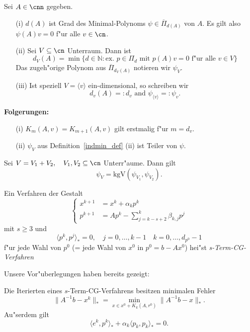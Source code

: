 \begin{defn} \label{indmin_def}
 Sei $A\in \cnn$ gegeben.
\begin{itemize}
\item[(i)] $d(A)$ ist Grad des Minimal-Polynoms $\psi \in \overline{\Pi}_{d(A)}$
      von $A$. Es gilt also $\psi(A)v = 0 $ f"ur alle $v \in \cn$.
\item[(ii)] Sei $V \subseteq \cn$ Unterraum. Dann ist
\[
d_V(A)=\min \{ d \in \mathbb{N}: \text{ex. } p\in \Pi_d \text{ mit } p(A)v=0 \mbox{ f"ur
     alle } v \in V \}
\]
Das zugeh"orige Polynom aus $\overline{\Pi}_{d_V(A)}$ notieren wir $\psi_V$.
\item[(iii)] Ist speziell $V=\langle v \rangle$ ein-dimensional, so schreiben wir
\[
d_v(A) =: d_v \mbox{ and } \psi_{\langle v \rangle} =: \psi_v.
\]
\end{itemize}
\end{defn}
\textbf{Folgerungen:}
\begin{itemize}
  \item[(i)] $K_m(A,v)=K_{m+1}(A,v)$ gilt erstmalig f"ur $m=d_v$.
  \item[(ii)] $\psi_V$ aus Definition~\ref{indmin_def} (ii) ist Teiler von $\psi$.
\end{itemize}
%
\begin{lem}
 Sei $V=V_1+V_2, \quad V_1,V_2 \subseteq \cn$ Unterr"aume.
 Dann gilt
 \[
 \psi_V=\text{kgV}\left(\psi_{V_1},\psi_{V_2}\right).
 \]
\end{lem}
%
\begin{defn}
 Ein Verfahren der Gestalt
  \begin{equation} \label{stermcg_def}
  \left\{
    \begin{array}{rl}
    x^{k+1} &= x^k+\alpha_k p^k \\
    p^{k+1} &= Ap^k-\sum_{j=k-s+2}^{k}{\beta_{k,j}p^j}
    \end{array}
    \right.
\end{equation}
mit $s \geq 3$ und
\begin{equation} \label{stermcg_prop}
 \langle p^k  , p^j \rangle_* =0, \quad j=0,\dots,k-1 \quad k=0,\dots,d_{p^0} -1
\end{equation}
 f"ur jede Wahl von $p^0$ (= jede Wahl von $x^0$ in $p^0=b-Ax^0$) hei"st {\em s-Term-CG-Verfahren}
\end{defn}

Unsere Vor"uberlegungen haben bereits gezeigt:
\begin{lem}
Die Iterierten eines $s$-Term-CG-Verfahrens besitzen minimalen Fehler
\[
   \| A^{-1}b - x^k \|_* = \min_{x \in x^0 + K_k(A,r^0)} \| A^{-1}b - x \|_*.
\]
Au"serdem gilt
\[  
\langle e^k,p^k\rangle_*+\alpha_k\langle p_k,p_k\rangle_* = 0.
\]
\end{lem}

